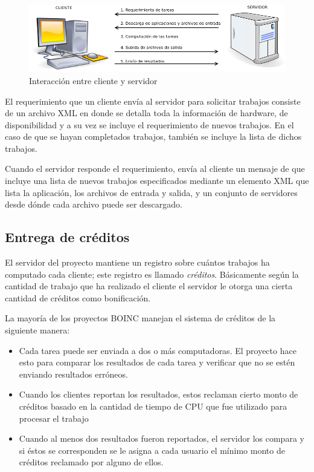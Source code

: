 \begin{figure}[H]
	\begin{center}
  		\includegraphics[scale=0.45]{images/how-boinc-works.png}
		\caption{Interacción entre cliente y servidor}
		\label{fig:how-boinc-works}
		\end{center}
\end{figure} 

El requerimiento que un cliente envía al servidor para solicitar trabajos consiste de un archivo XML en donde se detalla toda la información de hardware, de disponibilidad y a su vez se incluye el requerimiento de nuevos trabajos. En el caso de que se hayan completados trabajos, también se incluye la lista de dichos trabajos. 

Cuando el servidor responde el requerimiento, envía al cliente un mensaje de que incluye una lista de nuevos trabajos especificados mediante un elemento XML que lista la aplicación, los archivos de entrada y salida, y un conjunto de servidores desde dónde cada archivo puede ser descargado.

\subsection{Entrega de créditos}

El servidor del proyecto mantiene un registro sobre cuántos trabajos ha computado cada cliente; este registro es llamado \textit{créditos}. Básicamente según la cantidad de trabajo que ha realizado el cliente el servidor le otorga una cierta cantidad de créditos como bonificación.

La mayoría de los proyectos BOINC manejan el sistema de créditos de la siguiente manera:

\begin{itemize}
\item Cada tarea puede ser enviada a dos o más computadoras. El proyecto hace esto para comparar los resultados de cada tarea y verificar que no se estén enviando resultados erróneos.
\item Cuando los clientes reportan los resultados, estos reclaman cierto monto de créditos basado en la cantidad de tiempo de CPU que fue utilizado para procesar el trabajo
\item Cuando al menos dos resultados fueron reportados, el servidor los compara y si éstos se corresponden se le asigna a cada usuario el mínimo monto de créditos reclamado por alguno de ellos.
\end{itemize}

